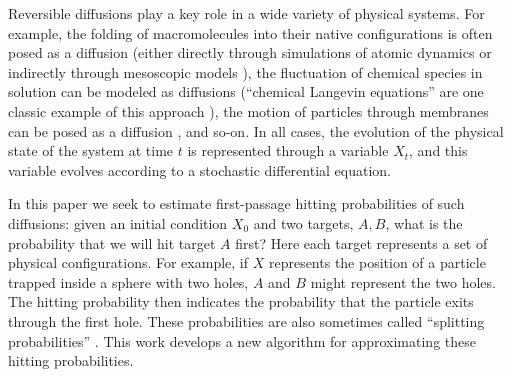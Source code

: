 \documentclass[12pt, nofootinbib,english, amsmath, amssymb, aps, priprint, graphicx,floatfix,draft]{revtex4-1}
\theoremstyle{plain}
\theoremstyle{definition}
\theoremstyle{plain}
\begin{document}
Reversible diffusions play a key role in a wide variety of physical systems.  For example, the folding of macromolecules into their native configurations is often posed as a diffusion (either directly through simulations of atomic dynamics or indirectly through mesoscopic models \cite{Scheraga2007-qw,Hospital2015-ol,lei2010direct}), the fluctuation of chemical species in solution can be modeled as diffusions (``chemical Langevin equations'' are one classic example of this approach \cite{sotiropoulos2011analytical,gillespie2000chemical}), the motion of particles through membranes can be posed as a diffusion \cite{holcman2004escape}, and so-on.   In all cases, the evolution of the physical state of the system at time $t$ is represented through a variable $X_t$, and this variable evolves according to a stochastic differential equation.

In this paper we seek to estimate first-passage hitting probabilities of such diffusions: given an initial condition $X_0$ and two targets, $A,B$, what is the probability that we will hit target $A$ first?   Here each target represents a set of physical configurations.  For example, if $X$ represents the position of a particle trapped inside a sphere with two holes, $A$ and $B$ might represent the two holes.  The hitting probability then indicates the probability that the particle exits through the first hole.  These probabilities are also sometimes called ``splitting probabilities'' \cite{E2006-fm}.  This work develops a new algorithm for approximating these hitting probabilities.
\end{document}
